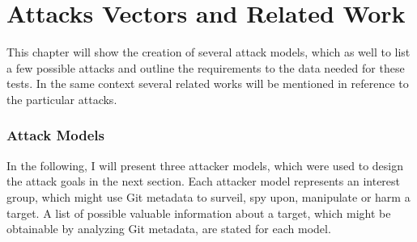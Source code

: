 \chapter{Attacks Vectors and Related Work}\label{related-work}
This chapter will show the creation of several attack models, which as well to list a few possible attacks and outline the requirements to the data needed for these tests.
In the same context several related works will be mentioned in reference to the particular attacks.


\subsection{Attack Models}\label{attack-models}
In the following, I will present three attacker models, which were used to design the attack goals in the next section.
Each attacker model represents an interest group, which might use Git metadata to surveil, spy upon, manipulate or harm a target.
A list of possible valuable information about a target, which might be obtainable by analyzing Git metadata, are stated for each model.

